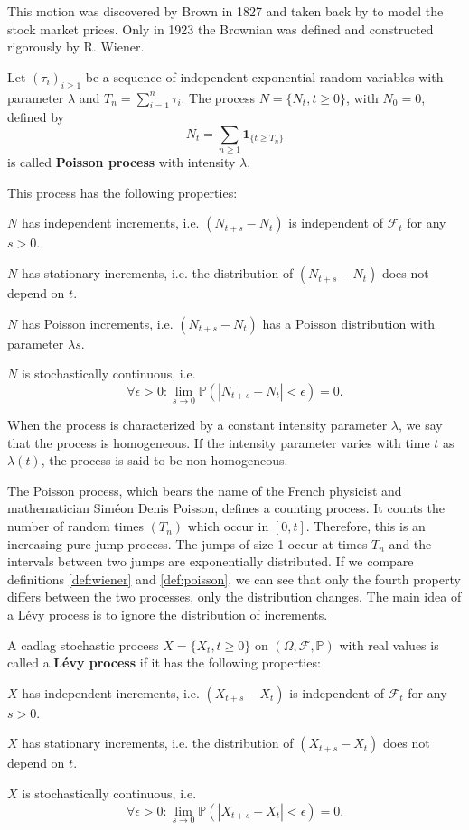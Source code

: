 This motion was discovered by Brown in 1827 and taken back by \citeauthor{Bac00} \citeyearpar{Bac00} to model the stock market prices. Only in 1923 the Brownian was defined and constructed rigorously by R. Wiener.

\begin{defn}\label{def:poisson}
Let $(\tau_i)_{i\geq 1}$ be a sequence of independent exponential random variables with parameter $\lambda$ and $T_n = \sum_{i=1}^n \tau_i$. The process $N = \{N_t,t\geq 0\}$, with $N_0=0$, defined by
$$N_t = \sum_{n\geq 1}\mathbf{1}_{\{t\geq T_n\}}$$
is called \textbf{Poisson process} with intensity $\lambda$.

This process has the following properties:
\begin{my_list_num}
\item $N$ has independent increments, i.e. $(N_{t+s}-N_t)$ is independent of $\mathcal{F}_t$ for any $s>0$. 
\item $N$ has stationary increments, i.e. the distribution of $(N_{t+s}-N_t)$ does not depend on $t$.
\item $N$ has Poisson increments, i.e. $(N_{t+s}-N_t)$ has a Poisson distribution with parameter $\lambda s$.
\item $N$ is stochastically continuous, i.e. $$\forall \epsilon>0: \lim_{s \to 0}\mathbb{P}(|N_{t+s}-N_t|<\epsilon)=0.$$
\end{my_list_num}
When the process is characterized by a constant intensity parameter $\lambda$, we say that the process is homogeneous. If the intensity parameter varies with time $t$ as $\lambda(t)$, the process is said to be non-homogeneous.
\end{defn}

The Poisson process, which bears the name of the French physicist and mathematician Sim\'eon Denis Poisson, defines a counting process. It counts the number of random times $(T_n)$ which occur in $[0,t]$. Therefore, this is an increasing pure jump process. The jumps of size 1 occur at times $T_n$ and the intervals between two jumps are exponentially distributed. If we compare definitions \ref{def:wiener} and \ref{def:poisson}, we can see that only the fourth property differs between the two processes, only the distribution changes. The main idea of a L\'evy process is to ignore the distribution of increments.

\begin{defn}
A cadlag stochastic process $X =\{X_t,t\geq 0\}$ on $(\Omega,\mathcal{F},\mathbb{P})$ with real values is called a \textbf{L\'evy process} if it has the following properties:
\begin{my_list_num}
\item $X$ has independent increments, i.e. $(X_{t+s}-X_t)$ is independent of $\mathcal{F}_t$ for any $s>0$. 
\item $X$ has stationary increments, i.e. the distribution of $(X_{t+s}-X_t)$ does not depend on $t$. 
\item $X$ is stochastically continuous, i.e. $$\forall \epsilon>0: \lim_{s \to 0}\mathbb{P}(|X_{t+s}-X_t|<\epsilon)=0.$$
\end{my_list_num}
\end{defn}

